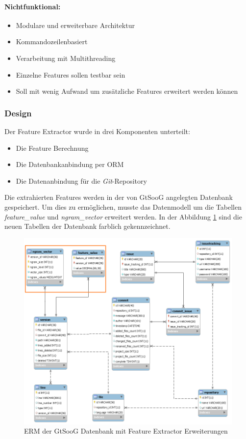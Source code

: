 \documentclass[10pt, a4paper]{article}
\begin{document}
\paragraph{Nichtfunktional:}
\begin{itemize}
	\item Modulare und erweiterbare Architektur
	\item Kommandozeilenbasiert
	\item Verarbeitung mit Multithreading
	\item Einzelne Features sollen testbar sein
	\item Soll mit wenig Aufwand um zusätzliche Features erweitert werden können
\end{itemize} 

\subsubsection{Design}
Der Feature Extractor wurde in drei Komponenten unterteilt:
\begin{itemize}
	\item Die Feature Berechnung 
	\item Die Datenbankanbindung per \ac{ORM}
	\item Die Datenanbindung für die \emph{Git}-Repository
\end{itemize}

Die extrahierten Features werden in der von GtSooG angelegten Datenbank gespeichert. Um dies zu ermöglichen, musste das Datenmodell um die Tabellen \emph{feature\_value} und \emph{ngram\_vector} erweitert werden. In der Abbildung \ref{fig:FeatureExtractor} sind die neuen Tabellen der Datenbank farblich gekennzeichnet.

\begin{figure}[!ht]\label{featureextractordbdesign}
	\centering
	\includegraphics[width=1\textwidth]{resources/images/db_reverse_engineered_feature_extractor.png}
	\caption{ERM der GtSooG Datenbank mit Feature Extractor Erweiterungen}
	\label{fig:FeatureExtractor}
\end{figure}
\end{document}
